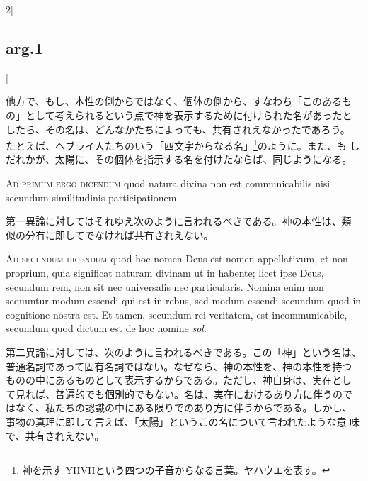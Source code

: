 \documentclass[paper=a4paper,fontsize=10pt,jafontsize=9pt,titlepage]{jlreq}
\begin{document}
\begin{paracol}{2}[\subsection{arg.1}]
\switchcolumn

他方で、もし、本性の側からではなく、個体の側から、すなわち「このあるも
の」として考えられるという点で神を表示するために付けられた名があったと
したら、その名は、どんなかたちによっても、共有されえなかったであろう。
たとえば、ヘブライ人たちのいう「四文字からなる名」\footnote{神を示す
YHVHという四つの子音からなる言葉。ヤハウエを表す。}のように。また、も
しだれかが、太陽に、その個体を指示する名を付けたならば、同じようになる。

\switchcolumn*[\subsection{ad.1}]

{\scshape Ad primum ergo dicendum} quod natura divina non est
communicabilis nisi secundum similitudinis participationem.

\switchcolumn

第一異論に対してはそれゆえ次のように言われるべきである。神の本性は、類
似の分有に即してでなければ共有されえない。

\switchcolumn*[\subsection{ad.2}]

{\scshape Ad secundum dicendum} quod hoc nomen Deus est nomen
appellativum, et non proprium, quia significat naturam divinam ut in
habente; licet ipse Deus, secundum rem, non sit nec universalis nec
particularis. Nomina enim non sequuntur modum essendi qui est in
rebus, sed modum essendi secundum quod in cognitione nostra est. Et
tamen, secundum rei veritatem, est incommunicabile, secundum quod
dictum est de hoc nomine {\itshape sol}.

\switchcolumn

第二異論に対しては、次のように言われるべきである。この「神」という名は、
普通名詞であって固有名詞ではない。なぜなら、神の本性を、神の本性を持つ
ものの中にあるものとして表示するからである。ただし、神自身は、実在とし
て見れば、普遍的でも個別的でもない。名は、実在におけるあり方に伴うので
はなく、私たちの認識の中にある限りでのあり方に伴うからである。しかし、
事物の真理に即して言えば、「太陽」というこの名について言われたような意
味で、共有されえない。

\switchcolumn*[\subsection{ad.3}]


\end{paracol}
\end{document}
